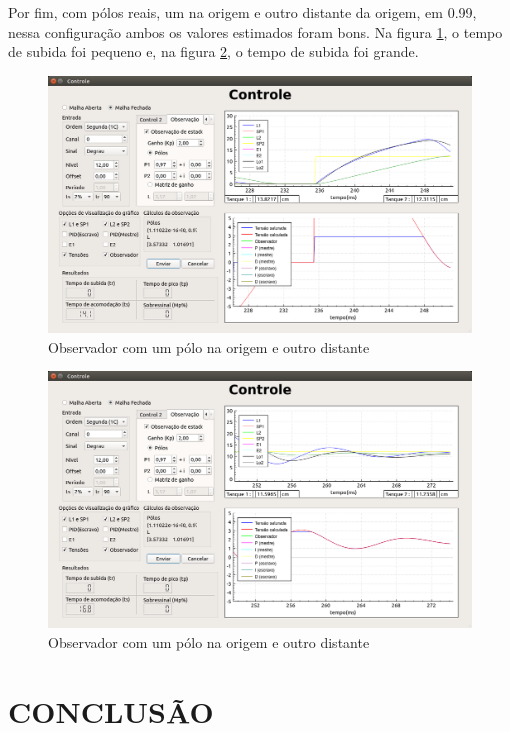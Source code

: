 \documentclass[a4paper,12pt]{article}
\begin{document}
\newpage
\hspace{4ex}Por fim, com pólos reais, um na origem e outro distante da origem, em 0.99, nessa configuração ambos os valores estimados foram bons. Na figura \ref{img7}, o tempo de subida foi pequeno e, na figura \ref{img8}, o tempo de subida foi grande.
\begin{figure}[!h]
\centering
\includegraphics[width=13cm]{FotosObservador/PoloRapidoELento2}
\caption{Observador com um pólo na origem e outro distante}
\label{img7}
\end{figure}
\begin{figure}[!h]
\centering
\includegraphics[width=13cm]{FotosObservador/PoloRapidoELento1}
\caption{Observador com um pólo na origem e outro distante}
\label{img8}
\end{figure}

\newpage


\thispagestyle{main}

\section{CONCLUSÃO}
\end{document}
